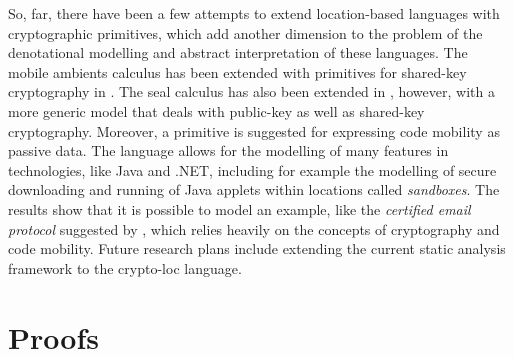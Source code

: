 \documentclass[10pt,a4paper,final,oneside,fleqn]{book}
\begin{document}
So, far, there have been a few attempts to extend location-based languages with cryptographic primitives, which add another dimension to the problem of the denotational modelling and abstract interpretation of these languages.  The mobile ambients calculus has been extended with primitives for shared-key cryptography in \cite{bugliesi03}.  The seal calculus has also been extended in \cite{blanchet2}, however, with a more generic model that deals with public-key as well as shared-key cryptography.  Moreover, a primitive is suggested for expressing code mobility as passive data.  The language allows for the modelling of many features in technologies, like Java and .NET, including for example the modelling of secure downloading and running of Java applets within locations called {\itshape sandboxes\/}. The results show that it is possible to model an example, like the {\itshape certified email protocol\/} suggested by \cite{abadi8}, which relies heavily on the concepts of cryptography and code mobility.  Future research plans include extending the current static analysis framework to the crypto-loc language.

\clearpage
\appendix
\chapter{Proofs}
\end{document}
